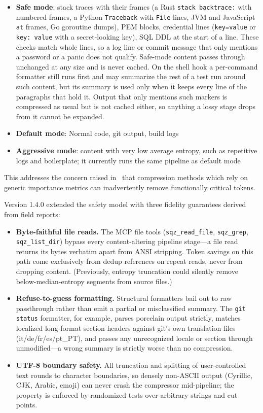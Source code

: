 \documentclass[10pt,twocolumn]{article}
\begin{document}
\begin{itemize}
  \item \textbf{Safe mode}: stack traces with their frames (a Rust \texttt{stack backtrace:} with numbered frames, a Python \texttt{Traceback} with \texttt{File} lines, JVM and JavaScript \texttt{at} frames, Go goroutine dumps), PEM blocks, credential lines (\texttt{key=value} or \texttt{key: value} with a secret-looking key), SQL DDL at the start of a line. These checks match whole lines, so a log line or commit message that only mentions a password or a panic does not qualify. Safe-mode content passes through unchanged at any size and is never cached. On the shell hook a per-command formatter still runs first and may summarize the rest of a test run around such content, but its summary is used only when it keeps every line of the paragraphs that hold it. Output that only mentions such markers is compressed as usual but is not cached either, so anything a lossy stage drops from it cannot be expanded.
  \item \textbf{Default mode}: Normal code, git output, build logs
  \item \textbf{Aggressive mode}: content with very low average entropy, such as repetitive logs and boilerplate; it currently runs the same pipeline as default mode
\end{itemize}

This addresses the concern raised in~\cite{goalgrad2025} that compression methods which rely on generic importance metrics can inadvertently remove functionally critical tokens.

Version 1.4.0 extended the safety model with three fidelity guarantees derived from field reports:

\begin{itemize}
  \item \textbf{Byte-faithful file reads.} The MCP file tools (\texttt{sqz\_read\_file}, \texttt{sqz\_grep}, \texttt{sqz\_list\_dir}) bypass every content-altering pipeline stage---a file read returns its bytes verbatim apart from ANSI stripping. Token savings on this path come exclusively from dedup references on repeat reads, never from dropping content. (Previously, entropy truncation could silently remove below-median-entropy segments from source files.)
  \item \textbf{Refuse-to-guess formatting.} Structural formatters bail out to raw passthrough rather than emit a partial or misclassified summary. The \texttt{git status} formatter, for example, parses porcelain output strictly, matches localized long-format section headers against git's own translation files (it/de/fr/es/pt\_PT), and passes any unrecognized locale or section through unmodified---a wrong summary is strictly worse than no compression.
  \item \textbf{UTF-8 boundary safety.} All truncation and splitting of user-controlled text rounds to character boundaries, so densely non-ASCII output (Cyrillic, CJK, Arabic, emoji) can never crash the compressor mid-pipeline; the property is enforced by randomized tests over arbitrary strings and cut points.
\end{itemize}
\end{document}
